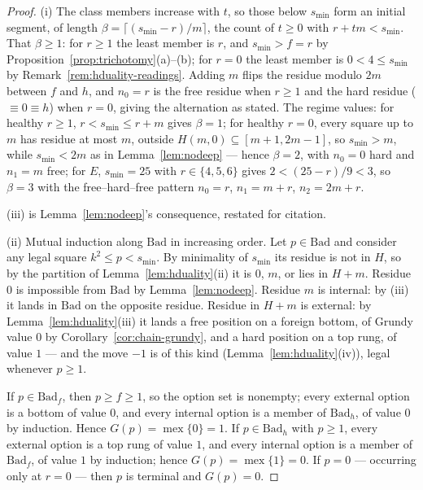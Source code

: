 \begin{proof}
(i) The class members increase with $t$, so those below $s_{\min}$ form
an initial segment, of length $\beta = \lceil (s_{\min} - r)/m \rceil$,
the count of $t \ge 0$ with $r + tm < s_{\min}$. That $\beta \ge 1$: for
$r \ge 1$ the least member is $r$, and $s_{\min} > f = r$ by
Proposition~\ref{prop:trichotomy}(a)--(b); for $r = 0$ the least member
is $0 < 4 \le s_{\min}$ by Remark~\ref{rem:hduality-readings}. Adding $m$
flips the residue modulo $2m$ between $f$ and $h$, and $n_0 = r$ is the
free residue when $r \ge 1$ and the hard residue ($\equiv 0 \equiv h$)
when $r = 0$, giving the alternation as stated. The regime values: for
healthy $r \ge 1$, $r < s_{\min} \le r + m$ gives $\beta = 1$; for
healthy $r = 0$, every square up to $m$ has residue at most $m$, outside
$H(m, 0) \subseteq [m+1, 2m-1]$, so $s_{\min} > m$, while
$s_{\min} < 2m$ as in Lemma~\ref{lem:nodeep} --- hence $\beta = 2$, with
$n_0 = 0$ hard and $n_1 = m$ free; for $E$, $s_{\min} = 25$ with
$r \in \{4, 5, 6\}$ gives $2 < (25 - r)/9 < 3$, so $\beta = 3$ with the
free--hard--free pattern $n_0 = r$, $n_1 = m+r$, $n_2 = 2m+r$.

(iii) is Lemma~\ref{lem:nodeep}'s consequence, restated for citation.

(ii) Mutual induction along $\mathrm{Bad}$ in increasing order. Let
$p \in \mathrm{Bad}$ and consider any legal square $k^2 \le p < s_{\min}$.
By minimality of $s_{\min}$ its residue is not in $H$, so by the
partition of Lemma~\ref{lem:hduality}(ii) it is $0$, $m$, or lies in
$H + m$. Residue $0$ is impossible from $\mathrm{Bad}$ by
Lemma~\ref{lem:nodeep}. Residue $m$ is internal: by (iii) it lands in
$\mathrm{Bad}$ on the opposite residue. Residue in $H + m$ is external:
by Lemma~\ref{lem:hduality}(iii) it lands a free position on a foreign
bottom, of Grundy value $0$ by Corollary~\ref{cor:chain-grundy}, and a
hard position on a top rung, of value $1$ --- and the move $-1$ is of
this kind (Lemma~\ref{lem:hduality}(iv)), legal whenever $p \ge 1$.

If $p \in \mathrm{Bad}_f$, then $p \ge f \ge 1$, so the option set is
nonempty; every external option is a bottom of value $0$, and every
internal option is a member of $\mathrm{Bad}_h$, of value $0$ by
induction. Hence $G(p) = \operatorname{mex}\{0\} = 1$. If
$p \in \mathrm{Bad}_h$ with $p \ge 1$, every external option is a top
rung of value $1$, and every internal option is a member of
$\mathrm{Bad}_f$, of value $1$ by induction; hence
$G(p) = \operatorname{mex}\{1\} = 0$. If $p = 0$ --- occurring only at
$r = 0$ --- then $p$ is terminal and $G(p) = 0$.
\end{proof}

